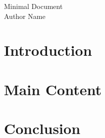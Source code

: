 \documentclass[12pt]{article}
\begin{document}
\begin{center}
    {\Huge Minimal Document}\\
    \vspace{1em}
    {\small Author Name}
\end{center}

\vspace{3em}

\section*{Introduction}
\lipsum[1-2]

\section*{Main Content}
\lipsum[3-4]

\section*{Conclusion}
\lipsum[5]
\end{document}
